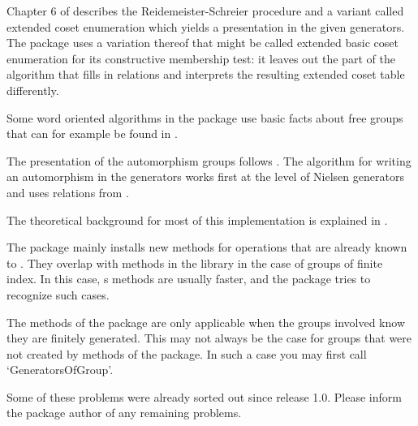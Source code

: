 Chapter 6 of \cite{Sims94} describes the Reidemeister-Schreier
procedure and a variant called extended coset enumeration which yields
a presentation in the given generators.  The {\FGA} package uses a
variation thereof that might be called extended basic coset
enumeration for its constructive membership test: it leaves out the
part of the algorithm that fills in relations and interprets the
resulting extended coset table differently.

Some word oriented algorithms in the {\FGA} package use basic facts about
free groups that can for example be found in \cite{LyndonSchupp77}.

The presentation of the automorphism groups follows \cite{Neumann33}.
The algorithm for writing an automorphism in the generators works
first at the level of Nielsen generators and uses relations from
\cite{Nielsen}.

The theoretical background for most of this implementation is
explained in \cite{Sievers03}.


The {\FGA} package mainly installs new methods for operations that are
already known to {\GAP}.  They overlap with methods in the {\GAP}
library in the case of groups of finite index.  In this case, {\GAP}s
methods are usually faster, and the {\GAP} package tries to recognize
such cases.

The methods of the {\FGA} package are only applicable when the groups
involved know they are finitely generated.  This may not always be the
case for groups that were not created by methods of the {\FGA}
package.  In such a case you may first call `GeneratorsOfGroup'.

Some of these problems were already sorted out since release 1.0.
Please inform the package author of any remaining problems.

